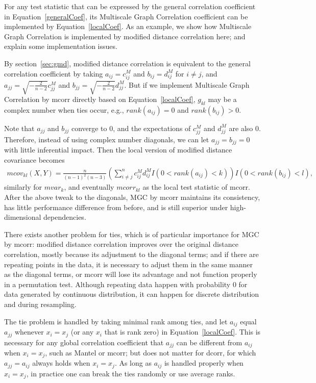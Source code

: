 \documentclass[11pt]{article}
\begin{document}
For any test statistic that can be expressed by the general correlation coefficient in Equation~\ref{generalCoef}, its Multiscale Graph Correlation coefficient can be implemented by Equation~\ref{localCoef}. As an example, we show how Multiscale Graph Correlation is implemented by modified distance correlation here; and explain some implementation issues.

By section~\ref{sec:gmd}, modified distance correlation is equivalent to the general correlation coefficient by taking $a_{ij}=c^{M}_{ij}$ and $b_{ij}=d^{M}_{ij}$ for $i \neq j$, and $a_{jj}=\sqrt{-\frac{2}{n-2}}c^{M}_{jj}$ and $b_{jj}=\sqrt{-\frac{2}{n-2}}d^{M}_{jj}$. But if we implement Multiscale Graph Correlation by mcorr directly based on Equation~\ref{localCoef}, $g_{kl}$ may be a complex number when ties occur, e.g., $rank(a_{ij})=0$ and $rank(b_{ij})>0$.

Note that $a_{jj}$ and $b_{jj}$ converge to $0$, and the expectations of $c^{M}_{jj}$ and $d^{M}_{jj}$ are also $0$. Therefore, instead of using complex number diagonals, we can let $a_{jj}=b_{jj}=0$ with little inferential impact. Then the local version of modified distance covariance becomes
\begin{align*}
mcov_{kl}(X,Y) = \frac{n}{(n-1)^2(n-3)}(\sum_{i \neq j}^{n}c^{M}_{ij}d^{M}_{ij}I(0<rank(a_{ij})<k))I(0<rank(b_{ij})<l),
\end{align*}
similarly for $mvar_{k}$, and eventually $mcorr_{kl}$ as the local test statistic of mcorr. After the above tweak to the diagonals, MGC by mcorr maintains its consistency, has little performance difference from before, and is still superior under high-dimensional dependencies.

There exists another problem for ties, which is of particular importance for MGC by mcorr: modified distance correlation improves over the original distance correlation, mostly because its adjustment to the diagonal terms; and if there are repeating points in the data, it is necessary to adjust them in the same manner as the diagonal terms, or mcorr will lose its advantage and not function properly in a permutation test. Although repeating data happen with probability $0$ for data generated by continuous distribution, it can happen for discrete distribution and during resampling.

The tie problem is handled by taking minimal rank among ties, and let $a_{ij}$ equal $a_{jj}$ whenever $x_{i}=x_{j}$ (or any $x_{i}$ that is rank zero) in Equation~\ref{localCoef}. This is necessary for any global correlation coefficient that $a_{jj}$ can be different from $a_{ij}$ when $x_{i}=x_{j}$, such as Mantel or mcorr; but does not matter for dcorr, for which $a_{jj}=a_{ij}$ always holds when $x_{i}=x_{j}$. As long as $a_{ij}$ is handled properly when $x_{i}=x_{j}$, in practice one can break the ties randomly or use average ranks.
\end{document}
